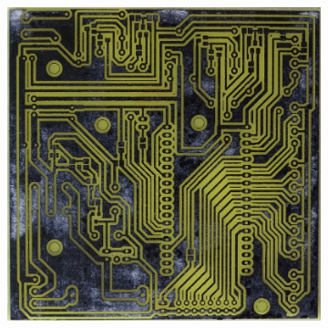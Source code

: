 \begin{figure}[H]
	\begin{subfigure}[c]{0.5\linewidth}		
		\includegraphics[width=\linewidth]{../../pictures/sensorstation/small/DSC00236.JPG}		
	\end{subfigure}
\end{figure}
